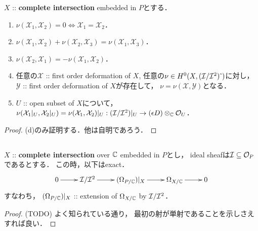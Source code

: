 \documentclass[a4paper]{jsarticle}
\newcommand{\famX}{\mathcal{X}}
\newcommand{\famY}{\mathcal{Y}}
\begin{document}
    \begin{Prop}
        $X$ :: \textbf{complete intersection} embedded in $P$とする．
        \begin{enumerate}[label=(\alph*), leftmargin=*]
            \item $\nu(\famX_1, \famX_2)=0 \iff \famX_1=\famX_2$．

            \item $\nu(\famX_1, \famX_2)+\nu(\famX_2, \famX_3)=\nu(\famX_1, \famX_3)$．

            \item $\nu(\famX_2, \famX_1)=-\nu(\famX_1, \famX_2)$．

            \item
                任意の$\famX$ :: first order deformation of $X$, 
                任意の$\nu \in H^0(X, (\mathcal{I}/\mathcal{I}^2)\,\hat{}\,)$に対し，
                $\famY$ :: first order deformation of $X$が存在して，
                $\nu=\nu(\famX, \famY)$となる．

            \item
                $U$ :: open subset of $X$について，
                $\nu(\famX_1|_U, \famX_2|_U)=\nu(\famX_1, \famX_2)|_U:
                (\shI/\shI^2)|_U \to (\epsilon D) \otimes_{\C} \shO_U$．
        \end{enumerate}
    \end{Prop}
    \begin{proof}
        (d)のみ証明する．他は自明であろう．
    \end{proof}

    \subsection{\tp{$\shE(\famX_1, \famX_2)$}{E(X1,X2)}}
    \begin{Lemma}
        $X$ :: \textbf{complete intersection} over $\mathbb{C}$ embedded in $P$とし，
        ideal sheafは$\mathcal{I} \subseteq \mathcal{O}_P$であるとする．
        この時，以下はexact．
        \[\xymatrix{
            0 \ar[r]& \shI/\shI^2 \ar[r]& (\shDer_{P/\C})|_{X} \ar[r]& \shDer_{X/\C} \ar[r]& 0
        }\]
        すなわち，
        $(\Omega_{P/\mathbb{C}})|_{X}$ :: extension of $\Omega_{X/\mathbb{C}}$ by $\mathcal{I}/\mathcal{I}^2$．
    \end{Lemma}
    \begin{proof}
        (TODO)
        よく知られている通り，
        最初の射が単射であることを示しさえすれば良い．
    \end{proof}
\end{document}
